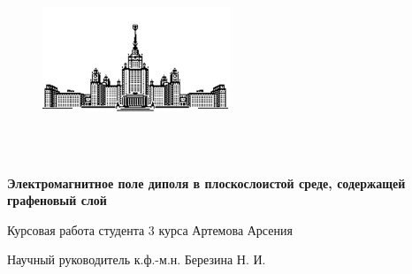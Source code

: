 


		\newpage
	
	\begin{figure}[h] %
		\centering %
		\includegraphics[width=0.5\textwidth]{МГУ.PNG} %
	
	\end{figure}
	
	\begin{center}
		 \\
		
		 \\
		
	
		
	\end{center}
	
	
	
	\vspace{5em}
	
	\begin{center}
		\textbf{\LARGE{Электромагнитное поле диполя в плоскослоистой среде, содержащей графеновый слой}}
	\end{center}
	
	\vspace{2em}
	
	\begin{center}
		\large{Курсовая работа студента 3 курса Артемова Арсения}
	\end{center}
	
	\vspace{6em}
	
	\begin{flushright}
		
		\large{	Научный руководитель \linebreak
			к.ф.-м.н. Березина Н. И.}\\
		\vspace{3em}
		
		
	\end{flushright}
	
